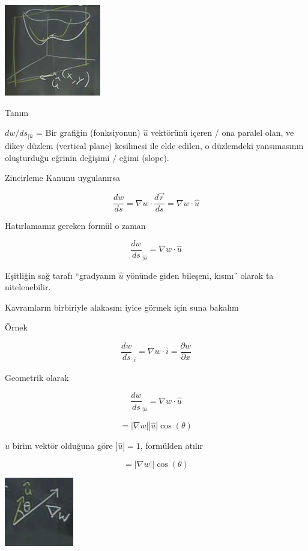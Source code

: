 \documentclass[12pt,fleqn]{article}\usepackage{../../common}
\begin{document}
\begin{center}
\includegraphics[height=4cm]{12_7.png}
\end{center}

Tanım

$dw / ds_{|\hat{u}}$ = Bir grafiğin (fonksiyonun) $\hat{u}$ vektörünü içeren /
ona paralel olan, ve dikey düzlem (vertical plane) kesilmesi ile elde edilen, o
düzlemdeki yansımasının oluşturduğu eğrinin değişimi / eğimi (slope).

Zincirleme Kanunu uygulanırsa

$$ \frac{dw}{ds} = \nabla w \cdot \frac{d\vec{r}}{ds} 
= \nabla w \cdot \hat{u}
$$

Hatırlamamız gereken formül o zaman

$$ \frac{dw}{ds}_{|\hat{u}} =  \nabla w \cdot \hat{u} $$

Eşitliğin sağ tarafı ``gradyanın $\hat{u}$ yönünde giden bileşeni, kısmı''
olarak ta nitelenebilir. 

Kavramların birbiriyle alakasını iyice görmek için suna bakalım

Örnek

$$ 
\frac{dw}{ds}_{|\hat{i}} =  \nabla w \cdot \hat{i} = 
\frac{\partial w}{\partial x} $$

Geometrik olarak

$$ \frac{dw}{ds}_{|\hat{u}} =  \nabla w \cdot \hat{u} $$

$$ =  |\nabla w||\hat{u}|\cos(\theta)  $$

$\hat{u}$ birim vektör olduğuna göre $|\hat{u}| = 1$, formülden atılır

$$ =  |\nabla w||\cos(\theta)  $$

\begin{center}
\includegraphics[height=3cm]{12_8.png}
\end{center}
\end{document}
